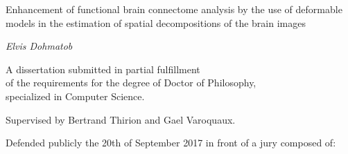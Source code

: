 \documentclass[nobib, a4paper, notoc, twoside, justified, openany]{tufte-book}
\begin{document}
\begin{titlepage}
\begin{fullwidth}
\begin{center}

\vspace{2pc}
{ \Huge
{\color{msblue} {Enhancement of functional brain connectome analysis by the use of deformable
models in the estimation of spatial decompositions of the brain images}} \\[0.5cm]
}




\vspace{3pc}
{\Huge \it Elvis Dohmatob} \\

\vspace{3pc}



{\LARGE A dissertation submitted in partial fulfillment \\ \vspace{10pt} of the requirements for the degree of Doctor of Philosophy, \\ \vspace{10pt} specialized in Computer Science.} \\
\vspace{1pc}

{\LARGE Supervised by {Bertrand Thirion} and {Gael Varoquaux}.}


\vspace{2pc}
{\LARGE Defended publicly the 20th of September 2017 in front of a jury composed of:}
\vspace{2pc}



\end{center}
\end{fullwidth}
\end{titlepage}
\end{document}
